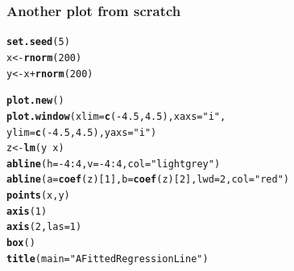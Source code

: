 \documentclass[12pt]{beamer}\usepackage[]{graphicx}\usepackage[]{color}
\makeatletter
\newcommand{\hlnum}[1]{\textcolor[rgb]{0.686,0.059,0.569}{#1}}%
\newcommand{\hlstr}[1]{\textcolor[rgb]{0.192,0.494,0.8}{#1}}%
\newcommand{\hlopt}[1]{\textcolor[rgb]{0,0,0}{#1}}%
\newcommand{\hlstd}[1]{\textcolor[rgb]{0.345,0.345,0.345}{#1}}%
\newcommand{\hlkwb}[1]{\textcolor[rgb]{0.69,0.353,0.396}{#1}}%
\newcommand{\hlkwc}[1]{\textcolor[rgb]{0.333,0.667,0.333}{#1}}%
\newcommand{\hlkwd}[1]{\textcolor[rgb]{0.737,0.353,0.396}{\textbf{#1}}}%
\newenvironment{kframe}{%
 \def\at@end@of@kframe{}%
 \ifinner\ifhmode%
  \def\at@end@of@kframe{\end{minipage}}%
  \begin{minipage}{\columnwidth}%
 \fi\fi%
 \def\FrameCommand##1{\hskip\@totalleftmargin \hskip-\fboxsep
 \colorbox{shadecolor}{##1}\hskip-\fboxsep
     \hskip-\linewidth \hskip-\@totalleftmargin \hskip\columnwidth}%
 \MakeFramed {\advance\hsize-\width
   \@totalleftmargin\z@ \linewidth\hsize
   \@setminipage}}%
 {\par\unskip\endMakeFramed%
 \at@end@of@kframe}
\newenvironment{knitrout}{}{} %
\makeatother
\begin{document}
\begin{frame}[fragile]
\frametitle{Another plot from scratch}
\begin{knitrout}\footnotesize
{}\color{fgcolor}\begin{kframe}
\begin{alltt}
\hlkwd{set.seed}\hlstd{(}\hlnum{5}\hlstd{)}
\hlstd{x} \hlkwb{<-} \hlkwd{rnorm}\hlstd{(}\hlnum{200}\hlstd{)}
\hlstd{y} \hlkwb{<-} \hlstd{x} \hlopt{+} \hlkwd{rnorm}\hlstd{(}\hlnum{200}\hlstd{)}

\hlkwd{plot.new}\hlstd{()}
\hlkwd{plot.window}\hlstd{(}\hlkwc{xlim} \hlstd{=} \hlkwd{c}\hlstd{(}\hlopt{-}\hlnum{4.5}\hlstd{,} \hlnum{4.5}\hlstd{),} \hlkwc{xaxs} \hlstd{=} \hlstr{"i"}\hlstd{,}
            \hlkwc{ylim} \hlstd{=} \hlkwd{c}\hlstd{(}\hlopt{-}\hlnum{4.5}\hlstd{,} \hlnum{4.5}\hlstd{),} \hlkwc{yaxs} \hlstd{=} \hlstr{"i"}\hlstd{)}
\hlstd{z} \hlkwb{<-} \hlkwd{lm}\hlstd{(y} \hlopt{~} \hlstd{x)}
\hlkwd{abline}\hlstd{(}\hlkwc{h} \hlstd{=} \hlopt{-}\hlnum{4}\hlopt{:}\hlnum{4}\hlstd{,} \hlkwc{v} \hlstd{=} \hlopt{-}\hlnum{4}\hlopt{:}\hlnum{4}\hlstd{,} \hlkwc{col} \hlstd{=} \hlstr{"lightgrey"}\hlstd{)}
\hlkwd{abline}\hlstd{(}\hlkwc{a} \hlstd{=} \hlkwd{coef}\hlstd{(z)[}\hlnum{1}\hlstd{],} \hlkwc{b} \hlstd{=} \hlkwd{coef}\hlstd{(z)[}\hlnum{2}\hlstd{],} \hlkwc{lwd} \hlstd{=} \hlnum{2}\hlstd{,} \hlkwc{col} \hlstd{=} \hlstr{"red"}\hlstd{)}
\hlkwd{points}\hlstd{(x, y)}
\hlkwd{axis}\hlstd{(}\hlnum{1}\hlstd{)}
\hlkwd{axis}\hlstd{(}\hlnum{2}\hlstd{,} \hlkwc{las} \hlstd{=} \hlnum{1}\hlstd{)}
\hlkwd{box}\hlstd{()}
\hlkwd{title}\hlstd{(}\hlkwc{main} \hlstd{=} \hlstr{"A Fitted Regression Line"}\hlstd{)}
\end{alltt}
\end{kframe}
\end{knitrout}
\end{frame}

\end{document}
